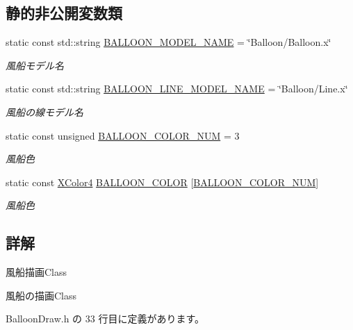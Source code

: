 \subsection*{静的非公開変数類}
\begin{DoxyCompactItemize}
\item 
static const std\+::string \mbox{\hyperlink{class_balloon_draw_a892d427dfc33f87ab174257cfc8cd7b1}{B\+A\+L\+L\+O\+O\+N\+\_\+\+M\+O\+D\+E\+L\+\_\+\+N\+A\+ME}} = \char`\"{}Balloon/Balloon.\+x\char`\"{}
\begin{DoxyCompactList}\small\item\em 風船モデル名 \end{DoxyCompactList}\item 
static const std\+::string \mbox{\hyperlink{class_balloon_draw_aa802c13b2c618cff5a1b51e87b8cf657}{B\+A\+L\+L\+O\+O\+N\+\_\+\+L\+I\+N\+E\+\_\+\+M\+O\+D\+E\+L\+\_\+\+N\+A\+ME}} = \char`\"{}Balloon/Line.\+x\char`\"{}
\begin{DoxyCompactList}\small\item\em 風船の線モデル名 \end{DoxyCompactList}\item 
static const unsigned \mbox{\hyperlink{class_balloon_draw_a9c7de251bb86760a8447fa41d247e5a9}{B\+A\+L\+L\+O\+O\+N\+\_\+\+C\+O\+L\+O\+R\+\_\+\+N\+UM}} = 3
\begin{DoxyCompactList}\small\item\em 風船色 \end{DoxyCompactList}\item 
static const \mbox{\hyperlink{_vector3_d_8h_a680c30c4a07d86fe763c7e01169cd6cc}{X\+Color4}} \mbox{\hyperlink{class_balloon_draw_a13857f5f6308f7f2903322c7a86b18fd}{B\+A\+L\+L\+O\+O\+N\+\_\+\+C\+O\+L\+OR}} \mbox{[}\mbox{\hyperlink{class_balloon_draw_a9c7de251bb86760a8447fa41d247e5a9}{B\+A\+L\+L\+O\+O\+N\+\_\+\+C\+O\+L\+O\+R\+\_\+\+N\+UM}}\mbox{]}
\begin{DoxyCompactList}\small\item\em 風船色 \end{DoxyCompactList}\end{DoxyCompactItemize}


\subsection{詳解}
風船描画\+Class 

風船の描画\+Class 

 Balloon\+Draw.\+h の 33 行目に定義があります。



